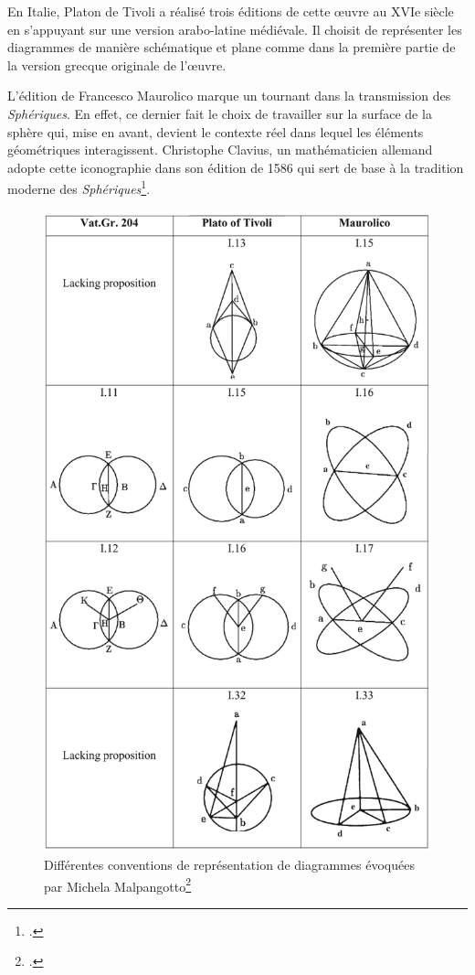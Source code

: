 En Italie, Platon de Tivoli a réalisé trois éditions de cette œuvre au XVIe siècle en s'appuyant sur une version arabo-latine médiévale.
Il choisit de représenter les diagrammes de manière schématique et plane comme dans la première partie de la version grecque originale de l'œuvre.

L'édition de Francesco Maurolico marque un tournant dans la transmission des \textit{Sphériques}.
En effet, ce dernier fait le choix de travailler sur la surface de la sphère qui, mise en avant, devient le contexte réel dans lequel les éléments géométriques interagissent.
Christophe Clavius, un mathématicien allemand adopte cette iconographie dans son édition de 1586 qui sert de base à la tradition moderne des \textit{Sphériques}\footcite{malpangottoGraphicalChoicesGeometrical2010}.

\begin{figure}[h]
	\centering
	\includegraphics[width=0.9\linewidth]{images/conventions_diagrammes.png}
	\caption{Différentes conventions de représentation de diagrammes évoquées par Michela Malpangotto\footcite{malpangottoGraphicalChoicesGeometrical2010}}
	\label{fig:conventions}
\end{figure}

